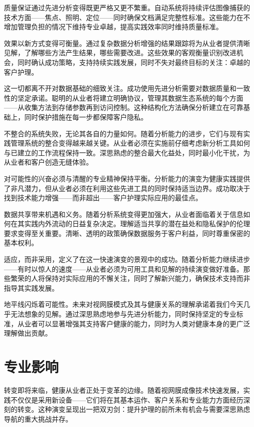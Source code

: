 \documentclass[
  Letterpaper,
]{scrbook}
\begin{document}
质量保证通过先进分析变得既更严格又更不繁重。自动系统将持续评估图像捕获的技术方面------焦点、照明、定位------同时确保文档满足完整性标准。这些能力在不增加管理负担的情况下维持专业卓越，提高实践效率同时维持质量标准。

效果以新方式变得可衡量。通过复杂数据分析增强的结果跟踪将为从业者提供清晰见解，了解哪些方法产生结果，哪些需要改进。这些效果的客观衡量识别改进机会，同时确认成功策略，支持持续实践发展，同时不失对最终目标的关注：卓越的客户护理。

这一切都离不开对数据基础的细致关注。成功使用先进分析需要对数据质量和一致性的坚定承诺。聪明的从业者将建立明确协议，管理其数据生态系统的每个方面------从收集方法到存储参数再到访问控制。这种结构化方法确保分析建立在可靠基础上，同时保护措施在每一步都保障客户隐私。

不整合的系统失败，无论其各自的力量如何。随着分析能力的进步，它们与现有实践管理系统的整合变得越来越关键。从业者必须在实施前仔细考虑新分析工具如何与已建立的工作流程保持一致。深思熟虑的整合最大化益处，同时最小化干扰，为从业者和客户创造无缝体验。

对可能性的兴奋必须与清醒的专业精神保持平衡。分析能力的演变为健康实践提供了非凡潜力，但从业者必须在利用这些先进工具的同时保持适当边界。成功取决于找到技术能力增强------而非超出------客户护理实际应用的最佳点。

数据共享带来机遇和义务。随着分析系统变得更加强大，从业者面临着关于信息如何在其实践内外流动的日益复杂决定。理解适当共享的潜在益处和隐私保护的伦理要求变得至关重要。清晰、透明的政策确保数据服务于客户利益，同时尊重保密的基本权利。

适应，而非采用，定义了在这一快速演变的景观中的成功。随着分析能力继续进步------有时以惊人的速度------从业者必须为可用工具和见解的持续演变做好准备。那些繁荣的人将保持对实际应用的不懈关注，同时了解新兴能力，确保技术支持而非指导其实践发展。

地平线闪烁着可能性。未来对视网膜模式及其与健康关系的理解承诺着我们今天几乎无法想象的见解。通过深思熟虑地参与先进分析能力，同时保持坚定的专业标准，从业者可以显著增强其支持客户健康的能力，同时为人类对健康本身的更广泛理解做出贡献。

\section{专业影响}\label{ux4e13ux4e1aux5f71ux54cd}

转变即将来临，健康从业者正处于变革的边缘。随着视网膜成像技术快速发展，实践不仅仅是采用新设备------它们将在其基本运作、客户关系和专业能力方面经历深刻的转变。这种演变呈现出一把双刃剑：提升护理的前所未有机会与需要深思熟虑导航的重大挑战并存。
\end{document}
